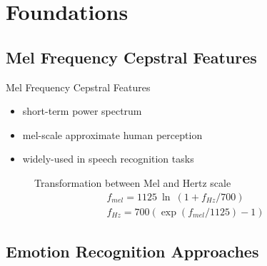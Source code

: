 \section{Foundations} %
\subsection{Mel Frequency Cepstral Features}
	\begin{frame}[t]{Mel Frequency Cepstral Features}
		\begin{minipage}[t]{0.48\linewidth}
			\begin{itemize}
				\item short-term power spectrum 
				\item mel-scale approximate human perception
				\item widely-used in speech recognition tasks
			\end{itemize}
		\end{minipage}
		\begin{minipage}[t]{0.48\linewidth}
			\begin{figure}
			Transformation between Mel and Hertz scale
				\begin{eqnarray}
				f_{mel} = 1125~\ln~(1+f_{Hz}/700)\\
				f_{Hz} = 700 \left(\exp(f_{mel}/1125)-1\right)
				\end{eqnarray}

			\end{figure}

		\end{minipage}
	\end{frame}


\subsection{Emotion Recognition Approaches}

